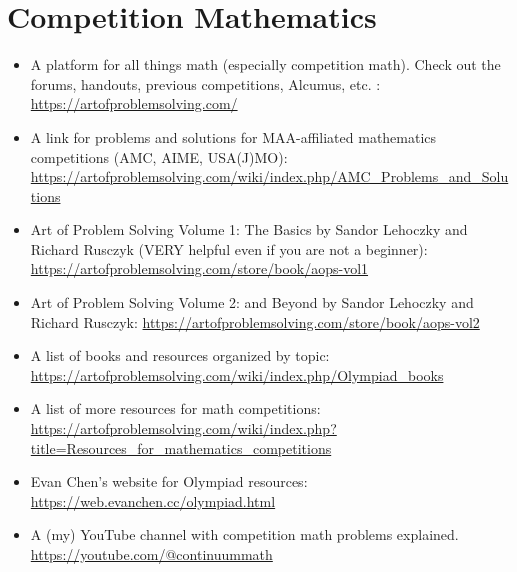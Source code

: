 \section{Competition Mathematics}
\begin{itemize}
    \item A platform for all things math (especially competition math). Check out the forums, handouts, previous competitions, Alcumus, etc. : \url{https://artofproblemsolving.com/}
    \item A link for problems and solutions for MAA-affiliated mathematics competitions (AMC, AIME, USA(J)MO): \url{https://artofproblemsolving.com/wiki/index.php/AMC_Problems_and_Solutions}
    \item Art of Problem Solving Volume 1: The Basics by Sandor Lehoczky and Richard Rusczyk (VERY helpful even if you are not a beginner): \url{https://artofproblemsolving.com/store/book/aops-vol1} 
    \item Art of Problem Solving Volume 2: and Beyond by Sandor Lehoczky and Richard Rusczyk: \url{https://artofproblemsolving.com/store/book/aops-vol2}
    \item A list of books and resources organized by topic: \url{https://artofproblemsolving.com/wiki/index.php/Olympiad_books}
    \item A list of more resources for math competitions: \url{https://artofproblemsolving.com/wiki/index.php?title=Resources_for_mathematics_competitions}
    \item Evan Chen's website for Olympiad resources: \url{https://web.evanchen.cc/olympiad.html}
    \item A (my) YouTube channel with competition math problems explained. \url{https://youtube.com/@continuummath}
\end{itemize}

